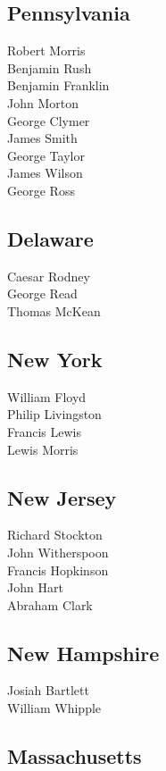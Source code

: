 \documentclass[a4paper,landscape,10pt]{article}
\begin{document}
\begin{multicols}{7}
\subsection*{Pennsylvania}

Robert Morris\\
Benjamin Rush\\
Benjamin Franklin\\
John Morton\\
George Clymer\\
James Smith\\
George Taylor\\
James Wilson\\
George Ross

\subsection*{Delaware}

Caesar Rodney\\
George Read\\
Thomas McKean

\subsection*{New York}

William Floyd\\
Philip Livingston\\
Francis Lewis\\
Lewis Morris

\subsection*{New Jersey}

Richard Stockton\\
John Witherspoon\\
Francis Hopkinson\\
John Hart\\
Abraham Clark

\subsection*{New Hampshire}

Josiah Bartlett\\
William Whipple\\

\subsection*{Massachusetts}


\end{multicols}
\end{document}
